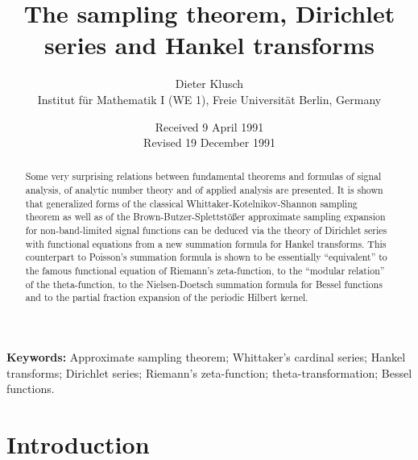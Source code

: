 \documentclass[11pt]{article}
\title{The sampling theorem, Dirichlet series and Hankel transforms}
\author{Dieter Klusch \\ Institut f\"{u}r Mathematik I (WE 1), Freie Universit\"{a}t Berlin, Germany}
\date{Received 9 April 1991 \\ Revised 19 December 1991}
\theoremstyle{plain}
\begin{document}
\maketitle

\begin{abstract}
Some very surprising relations between fundamental theorems and formulas of signal analysis, of analytic number theory and of applied analysis are presented. It is shown that generalized forms of the classical Whittaker-Kotelnikov-Shannon sampling theorem as well as of the Brown-Butzer-Splettstößer approximate sampling expansion for non-band-limited signal functions can be deduced via the theory of Dirichlet series with functional equations from a new summation formula for Hankel transforms. This counterpart to Poisson's summation formula is shown to be essentially ``equivalent'' to the famous functional equation of Riemann's zeta-function, to the ``modular relation'' of the theta-function, to the Nielsen-Doetsch summation formula for Bessel functions and to the partial fraction expansion of the periodic Hilbert kernel.
\end{abstract}

\noindent\textbf{Keywords:} Approximate sampling theorem; Whittaker's cardinal series; Hankel transforms; Dirichlet series; Riemann's zeta-function; theta-transformation; Bessel functions.

\section{Introduction}
\label{sec:intro}
\end{document}
